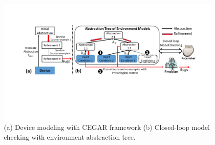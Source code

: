 \begin{figure}[!t]
		\centering
		\includegraphics[width=\textwidth]{figs/distinction.pdf}
		\caption{\small (a) Device modeling with CEGAR framework (b) Closed-loop model checking with environment abstraction tree.}%
		  \vspace{-10pt}
		\label{fig:distinction}
\end{figure}


